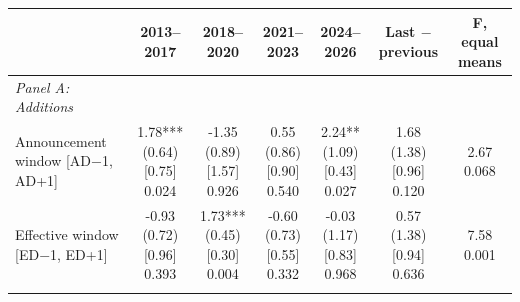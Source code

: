 \begin{threeparttable}
\begingroup
\renewcommand\cellalign{t}
\renewcommand\arraystretch{1}
\setlength{\tabcolsep}{5pt}
\begin{tabular}{@{}lcccccc}
\toprule
 & 2013–2017 & 2018–2020 & 2021–2023 & 2024–2026 & Last $-$ previous & F, equal means \\
\midrule
\emph{Panel A: Additions} \\
\addlinespace[0.25ex]
\addlinespace[1ex]
Announcement window [AD$-$1, AD+1] & \makecell{1.78***\\(0.64)\\{}[0.75]\\{0.024}} & \makecell{-1.35\\(0.89)\\{}[1.57]\\{0.926}} & \makecell{0.55\\(0.86)\\{}[0.90]\\{0.540}} & \makecell{2.24**\\(1.09)\\{}[0.43]\\{0.027}} & \makecell{1.68\\(1.38)\\{}[0.96]\\{0.120}} & \makecell{2.67\\{0.068}} \\
\addlinespace[0.25ex]
\addlinespace[0.25ex]
Effective window [ED$-$1, ED+1] & \makecell{-0.93\\(0.72)\\{}[0.96]\\{0.393}} & \makecell{1.73***\\(0.45)\\{}[0.30]\\{0.004}} & \makecell{-0.60\\(0.73)\\{}[0.55]\\{0.332}} & \makecell{-0.03\\(1.17)\\{}[0.83]\\{0.968}} & \makecell{0.57\\(1.38)\\{}[0.94]\\{0.636}} & \makecell{7.58\\{0.001}} \\
\addlinespace[0.25ex]
\addlinespace[0.25ex]

\end{tabular}
\end{threeparttable}
